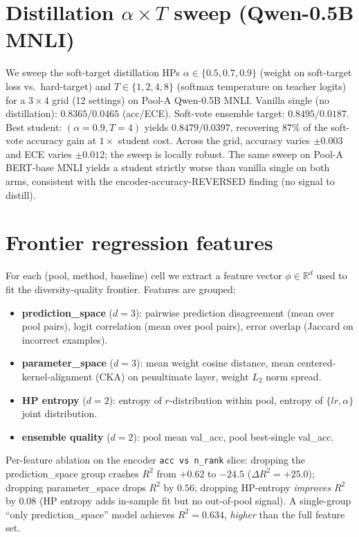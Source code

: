 \documentclass[11pt]{article}
\begin{document}
\section{Distillation $\alpha\times T$ sweep (Qwen-0.5B MNLI)}\label{app:distill}
We sweep the soft-target distillation HPs $\alpha\in\{0.5,0.7,0.9\}$ (weight on soft-target loss vs.\ hard-target) and $T\in\{1,2,4,8\}$ (softmax temperature on teacher logits) for a $3\times4$ grid (12 settings) on Pool-A Qwen-0.5B MNLI. Vanilla single (no distillation): $0.8365 / 0.0465$ (acc/ECE). Soft-vote ensemble target: $0.8495 / 0.0187$. Best student: $(\alpha{=}0.9, T{=}4)$ yields $0.8479 / 0.0397$, recovering $87\%$ of the soft-vote accuracy gain at $1\times$ student cost. Across the grid, accuracy varies $\pm0.003$ and ECE varies $\pm0.012$; the sweep is locally robust. The same sweep on Pool-A BERT-base MNLI yields a student strictly worse than vanilla single on both arms, consistent with the encoder-accuracy-REVERSED finding (no signal to distill).

\section{Frontier regression features}\label{app:features}
For each (pool, method, baseline) cell we extract a feature vector $\phi\in\mathbb{R}^{d}$ used to fit the diversity-quality frontier. Features are grouped:
\begin{itemize}[leftmargin=*]
\item \textbf{prediction\_space} ($d{=}3$): pairwise prediction disagreement (mean over pool pairs), logit correlation (mean over pool pairs), error overlap (Jaccard on incorrect examples).
\item \textbf{parameter\_space} ($d{=}3$): mean weight cosine distance, mean centered-kernel-alignment (CKA) on penultimate layer, weight $L_2$ norm spread.
\item \textbf{HP entropy} ($d{=}2$): entropy of $r$-distribution within pool, entropy of $\{lr, \alpha\}$ joint distribution.
\item \textbf{ensemble quality} ($d{=}2$): pool mean val\_acc, pool best-single val\_acc.
\end{itemize}
Per-feature ablation on the encoder \texttt{acc vs n\_rank} slice: dropping the prediction\_space group crashes $R^2$ from $+0.62$ to $-24.5$ ($\Delta R^2 {=}{+}25.0$); dropping parameter\_space drops $R^2$ by $0.56$; dropping HP-entropy \emph{improves} $R^2$ by $0.08$ (HP entropy adds in-sample fit but no out-of-pool signal). A single-group ``only prediction\_space'' model achieves $R^2{=}0.634$, \emph{higher} than the full feature set.
\end{document}
